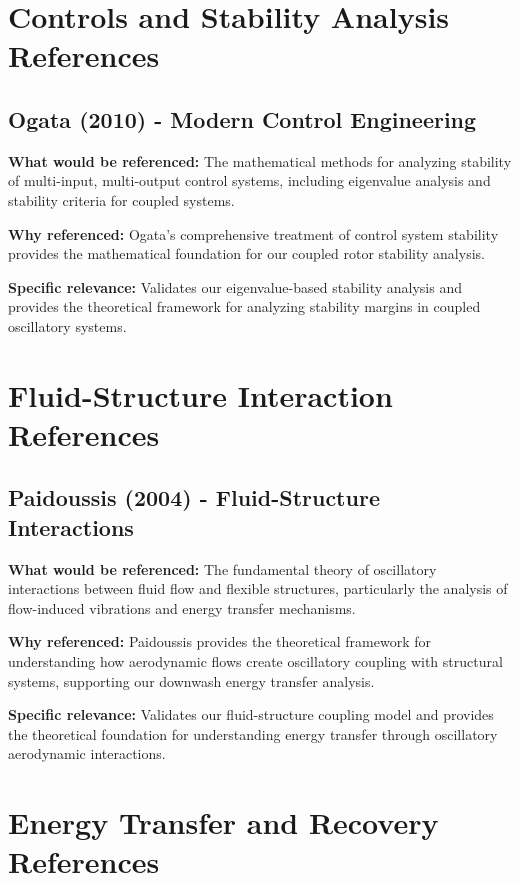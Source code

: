 \documentclass{article}
\begin{document}
\section{Controls and Stability Analysis References}

\subsection{Ogata (2010) - Modern Control Engineering}

\textbf{What would be referenced:} The mathematical methods for analyzing stability of multi-input, multi-output control systems, including eigenvalue analysis and stability criteria for coupled systems.

\textbf{Why referenced:} Ogata's comprehensive treatment of control system stability provides the mathematical foundation for our coupled rotor stability analysis.

\textbf{Specific relevance:} Validates our eigenvalue-based stability analysis and provides the theoretical framework for analyzing stability margins in coupled oscillatory systems.

\section{Fluid-Structure Interaction References}

\subsection{Paidoussis (2004) - Fluid-Structure Interactions}

\textbf{What would be referenced:} The fundamental theory of oscillatory interactions between fluid flow and flexible structures, particularly the analysis of flow-induced vibrations and energy transfer mechanisms.

\textbf{Why referenced:} Paidoussis provides the theoretical framework for understanding how aerodynamic flows create oscillatory coupling with structural systems, supporting our downwash energy transfer analysis.

\textbf{Specific relevance:} Validates our fluid-structure coupling model and provides the theoretical foundation for understanding energy transfer through oscillatory aerodynamic interactions.

\section{Energy Transfer and Recovery References}
\end{document}
